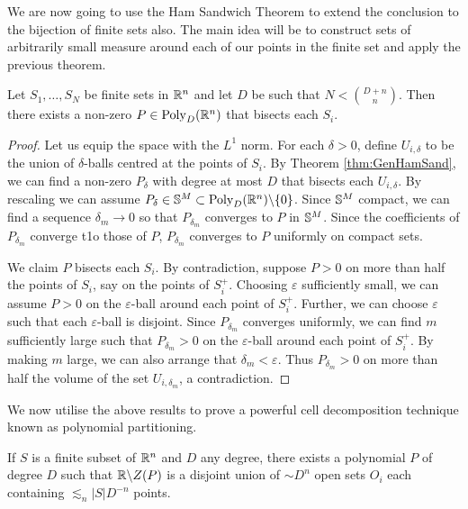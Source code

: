 We are now going to use the Ham Sandwich Theorem to extend the conclusion to the bijection of finite sets also.
The main idea will be to construct sets of arbitrarily small measure around each of our points in the finite set and apply the previous theorem.
\begin{corollary}
    Let $S_1, \dots , S_N$ be finite sets in $\mathbb R^n$ and let $D$ be such that $N < {{D+n}\choose{n}}$. 
    Then there exists a non-zero $P\in \operatorname{Poly}_D (\mathbb R^n)$ that bisects each $S_i$.  \label{thm:FiniteHamSandwich} 
\end{corollary}

\begin{proof}
    Let us equip the space with the $L^1$ norm.
    For each $\delta>0$, define $U_{i, \delta}$ to be the union of $\delta$-balls centred at the points of $S_i$. 
    By Theorem \ref{thm:GenHamSand}, we can find a non-zero $P_{\delta}$ with degree at most $D$ that bisects each $U_{i, \delta}$. 
    By rescaling we can assume $P_{\delta} \in \mathbb S^M \subset \text{Poly}_D (\mathbb R^n) \backslash \{0\}$.
    Since $\mathbb S^M$ compact, we can find a sequence $\delta_m \to 0$ so that $P_{\delta_{m}}$ converges to $P$ in $\mathbb S^M$.
    Since the coefficients of $P_{\delta_{m}}$ converge t1o those of $P$, $P_{\delta_{m}}$ converges to $P$ uniformly on compact sets.

    We claim $P$ bisects each $S_i$. 
    By contradiction, suppose $P>0$ on more than half the points of $S_i$, say on the points of $S_i^+$. 
    Choosing $\varepsilon$ sufficiently small, we can assume $P>0$ on the $\varepsilon$-ball around each point of $S_i^+$.
    Further, we can choose $\varepsilon$ such that each $\varepsilon$-ball is disjoint. 
    Since $P_{\delta_{m}}$ converges uniformly, we can find $m$ sufficiently large such that $P_{\delta_{m}}>0$ 
    on the $\varepsilon$-ball around each point of $S_i^+$.
    By making $m$ large, we can also arrange that $\delta_m < \varepsilon$.
    Thus $P_{\delta_{m}} > 0$ on more than half the volume of the set $U_{i, \delta_{m}}$, a contradiction. 
\end{proof}
We now utilise the above results to prove a powerful cell decomposition technique known as polynomial partitioning.
\begin{theorem}
    If $S$ is a finite subset of $\mathbb R^n$ and $D$ any degree, there exists
    a polynomial $P$ of degree $D$ such that $\mathbb R \backslash Z(P)$ is a disjoint union of $\sim D^n$ open sets $O_i$ each containing
    $\lesssim_n |S|D^{-n}$ points. \label{thm:PolyPartioning}
 \end{theorem}
 
